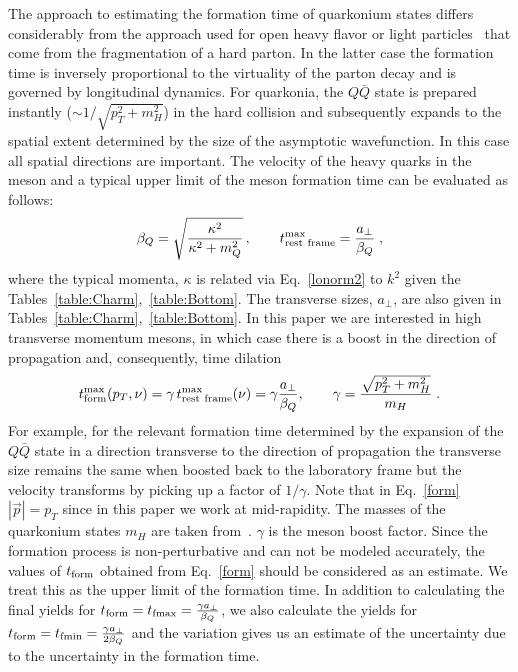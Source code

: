 \documentclass[article,showpacs,preprintnumbers,amsmath,amssymb]{revtex4}
\begin{document}
The approach to estimating the formation time of quarkonium states differs
considerably from the  approach used for open heavy
flavor\cite{hep-ph/0611109,Sharma:2009hn} or light
particles~\cite{arXiv:0807.1509} that come from the fragmentation of a hard
parton. In the latter case the formation time is inversely proportional to the
virtuality of the parton decay and is governed by longitudinal dynamics. For
quarkonia, the $Q\bar{Q}$ state is prepared instantly ($\sim 1/\sqrt{p_T^2
+m_H^2}$)  in the hard collision and subsequently expands to the spatial extent
determined by the size of the asymptotic wavefunction.  In this case all
spatial directions are important.  The velocity of the heavy quarks in the
meson and a typical upper limit of the meson formation time can be evaluated
as follows:
\begin{equation}
\beta_Q = \sqrt{ \frac{\kappa^2}{\kappa^2 + m_Q^2}    }\, ,  
\qquad    t_{\rm rest\  frame}^{\max} = \frac{a_\perp}{\beta_Q} \;,  
\label{formrest}
\end{equation} 
where the typical momenta, $\kappa$ is related via Eq.~\ref{lonorm2} to $k^2$
given the Tables~\ref{table:Charm},~\ref{table:Bottom}. The transverse sizes,
$a_\perp$, are
also given in Tables~\ref{table:Charm},~\ref{table:Bottom}. In this paper we
are  interested in high transverse momentum mesons, in which case there is a
boost in the direction of propagation and, consequently, time dilation      
\begin{equation}
t_{\rm form}^{\max}(p_T,\nu)=  \gamma \, t_{\rm rest\  frame}^{\max} (\nu) =
 \gamma \frac{a_\perp}{\beta_Q}, \qquad \gamma =  \frac{\sqrt{p_T^2 + m_H^2}}{m_H} \;. 
\label{form}
\end{equation}
For example, for the relevant formation time determined by the expansion of the
$Q\bar{Q}$ state in a direction transverse to the direction of propagation the
transverse size remains the same when boosted back to the laboratory frame but
the velocity transforms by  picking up a factor of $1/\gamma$.  Note that in
Eq.~\ref{form} $|\vec{p}| = p_T$ since in this paper we work at mid-rapidity.
The masses of the quarkonium states $m_H$ are taken from~\cite{pdg}. $\gamma$ is
the meson boost factor.  Since the formation process is non-perturbative and
can not be modeled accurately, the values of $t_{\rm form}$ obtained from
Eq.~\ref{form} should be considered as an estimate. We treat this as the upper
limit of the formation time. In addition to calculating the final yields for
$t_{\rm form}=t_{\rm f max}=\frac{\gamma a_\perp}{\beta_Q}$, we also calculate the
yields for $t_{\rm form}=t_{\rm f min}=\frac{\gamma a_\perp}{2\beta_Q}$ and the
variation gives us an estimate of the uncertainty due to the uncertainty in the
formation time. 
\end{document}
